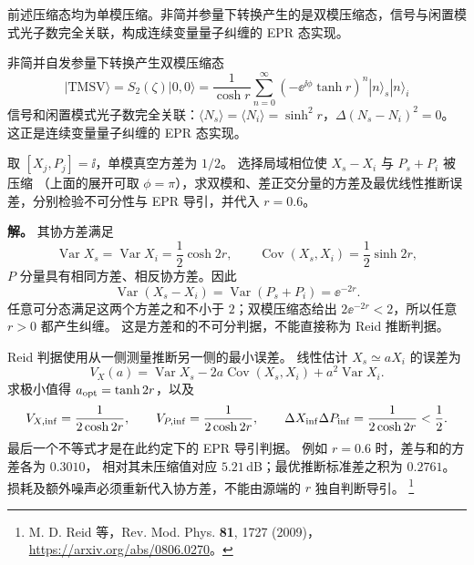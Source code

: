 前述压缩态均为单模压缩。非简并参量下转换产生的是双模压缩态，信号与闲置模式光子数完全关联，构成连续变量量子纠缠的 EPR 态实现。

非简并自发参量下转换产生双模压缩态
\[
|\mathrm{TMSV}\rangle=S_2(\zeta)|0,0\rangle
=\frac{1}{\cosh r}\sum_{n=0}^\infty(-\ee^{\ii\phi}\tanh r)^n|n\rangle_s|n\rangle_i
\]
信号和闲置模式光子数完全关联：\(\langle N_s\rangle=\langle N_i\rangle=\sinh^2 r\)，\(\Delta(N_s-N_i)^2=0\)。这正是连续变量量子纠缠的 EPR 态实现。

\begin{example}
取 $[X_j,P_j]=\ii$，单模真空方差为 $1/2$。
选择局域相位使 $X_s-X_i$ 与 $P_s+P_i$ 被压缩
（上面的展开可取 $\phi=\pi$），求双模和、差正交分量的方差及最优线性推断误差，分别检验不可分性与 EPR 导引，并代入 $r=0.6$。

\textbf{解。} 其协方差满足
\[
\operatorname{Var}X_s=\operatorname{Var}X_i=\frac12\cosh2r,
\qquad \operatorname{Cov}(X_s,X_i)=\frac12\sinh2r,
\]
$P$ 分量具有相同方差、相反协方差。因此
\[
\operatorname{Var}(X_s-X_i)=\operatorname{Var}(P_s+P_i)=\ee^{-2r}.
\]
任意可分态满足这两个方差之和不小于 $2$；双模压缩态给出
$2\ee^{-2r}<2$，所以任意 $r>0$ 都产生纠缠。
这是方差和的不可分判据，不能直接称为 Reid 推断判据。

Reid 判据使用从一侧测量推断另一侧的最小误差。
线性估计 $X_s\simeq aX_i$ 的误差为
\[
V_X(a)=\operatorname{Var}X_s-2a\operatorname{Cov}(X_s,X_i)
+a^2\operatorname{Var}X_i.
\]
求极小值得 $a_{\rm opt}=\tanh2r$，以及
\[
V_{X,\rm inf}=\frac1{2\cosh2r},\qquad
V_{P,\rm inf}=\frac1{2\cosh2r},\qquad
\Delta X_{\rm inf}\Delta P_{\rm inf}=\frac1{2\cosh2r}<\frac12.
\]
最后一个不等式才是在此约定下的 EPR 导引判据。
例如 $r=0.6$ 时，差与和的方差各为 $0.3010$，
相对其未压缩值对应 $5.21$\,dB；最优推断标准差之积为 $0.2761$。
损耗及额外噪声必须重新代入协方差，不能由源端的 $r$ 独自判断导引。
\footnote{M. D. Reid 等，Rev. Mod. Phys. \textbf{81}, 1727 (2009)，
\url{https://arxiv.org/abs/0806.0270}。}
\end{example}

